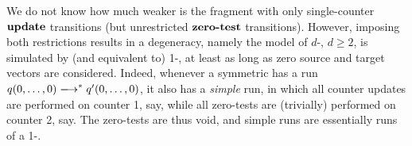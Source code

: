We do not know how much weaker is the fragment with only 
single-counter $\textbf{update}$ transitions (but unrestricted
$\textbf{zero-test}$ transitions).
However, imposing both restrictions results in a degeneracy,
namely the model of $d$-, $d\geq 2$,
is simulated by (and equivalent to) 1-\vass,
at least as long as zero source and target vectors are considered.
Indeed, 
whenever a symmetric \cm has a run 
$q(0,\ldots, 0)\step^* q'(0,\ldots, 0)$, it also has a
\emph{simple} run, in which all counter updates are performed on
counter 1, say, while all zero-tests are (trivially) performed on counter 2,
say.
The zero-tests are thus void, and simple runs are essentially
runs of a 1-\vass.
